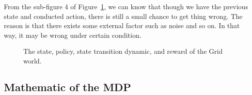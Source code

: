 \documentclass[11pt]{article}
\begin{document}
From the sub-figure 4 of Figure~\ref{fig:procedure}, we can know that though we have the previous state and conducted action, there is still a small chance to get thing wrong. The reason is that there exists some external factor such as noise and so on. In that way, it may be wrong under certain condition.
\begin{figure}[H]
    \centering
    
    
    \caption{The state, policy, state transition dynamic, and reward of the Grid world.}
    \label{fig:procedure}
\end{figure}


\subsection{Mathematic of the MDP}
\end{document}
